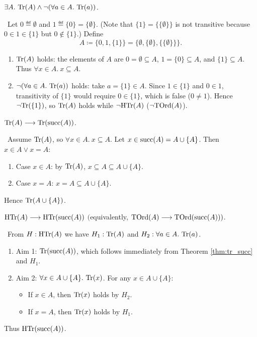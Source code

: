 \documentclass[10pt,a4paper]{article}
\begin{document}
\begin{theorem}
$\exists A.\ {\textrm{Tr}}(A) \land \neg (\forall a\in A.\ {\textrm{Tr}}(a))$.
\end{theorem}
\myprf\ Let $0 \eqdef \emptyset$ and $1 \eqdef \{0\} = \{\emptyset\}$. (Note that $\{1\} = \{\{\emptyset\}\}$ is not transitive because $0 \in 1 \in \{1\}$ but $0 \notin \{1\}$.) Define
$$A \coloneqq \{0, 1, \{1\}\} = \{\emptyset, \{\emptyset\}, \{\{\emptyset\}\}\}.$$
\begin{enumerate}
\item ${\textrm{Tr}}(A)$ holds: the elements of $A$ are $0 = \emptyset \subseteq A$, $1 = \{0\} \subseteq A$, and $\{1\} \subseteq A$. Thus $\forall x \in A.\ x \subseteq A$.
\item $\neg (\forall a \in A.\ \Tr(a))$ holds: take $a = \{1\} \in A$. Since $1 \in \{1\}$ and $0 \in 1$, transitivity of $\{1\}$ would require $0 \in \{1\}$, which is false ($0 \neq 1$). Hence $\neg {\textrm{Tr}}(\{1\})$, so ${\textrm{Tr}}(A)$ holds while $\neg {\textrm{HTr}}(A)$ ($\neg {\textrm{TOrd}}(A)$).
\end{enumerate}
\myqed

\begin{theorem}\label{thm:tr_succ}
${\textrm{Tr}}(A) \longrightarrow {\textrm{Tr}}({\textrm{succ}}(A))$.
\end{theorem}
\myprf\ Assume ${\textrm{Tr}}(A)$, so $\forall x\in A.\ x\subseteq A$. Let $x \in {\textrm{succ}}(A) = A\cup\{A\}$. Then $x\in A \lor x=A$:
\begin{enumerate}
\item Case $x\in A$: by ${\textrm{Tr}}(A)$, $x\subseteq A \subseteq A\cup\{A\}$.
\item Case $x = A$: $x = A \subseteq A\cup\{A\}$.
\end{enumerate}
Hence ${\textrm{Tr}}(A\cup\{A\})$. \myqed

\begin{theorem}\label{thm:tord_succ}
${\textrm{HTr}}(A) \longrightarrow {\textrm{HTr}}({\textrm{succ}}(A))$ \quad $($equivalently, ${\textrm{TOrd}}(A) \longrightarrow {\textrm{TOrd}}({\textrm{succ}}(A)))$.
\end{theorem}
\myprf\ From $H: {\textrm{HTr}}(A)$ we have $H_1: {\textrm{Tr}}(A)$ and $H_2: \forall a\in A.\ {\textrm{Tr}}(a)$.
\begin{enumerate}
\item Aim 1: ${\textrm{Tr}}({\textrm{succ}}(A))$, which follows immediately from Theorem \ref{thm:tr_succ} and $H_1$.
\item Aim 2: $\forall x\in A\cup\{A\}.\ \Tr(x)$. For any $x \in A \cup \{A\}$:
  \begin{itemize}
  \item If $x\in A$, then ${\textrm{Tr}}(x)$ holds by $H_2$.
  \item If $x = A$, then ${\textrm{Tr}}(x)$ holds by $H_1$.
  \end{itemize}
\end{enumerate}
Thus ${\textrm{HTr}}({\textrm{succ}}(A))$. \myqed
\end{document}
